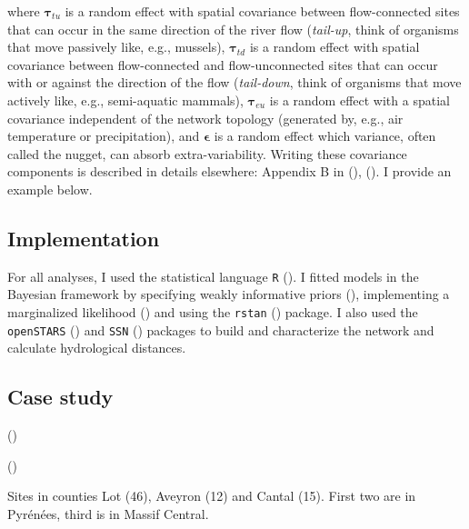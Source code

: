 \documentclass[
  11pt,
  a4paper,
]{article}
\begin{document}
where \(\boldsymbol{\tau}_{tu}\) is a random effect with spatial covariance between flow-connected sites that can occur in the same direction of the river flow (\emph{tail-up}, think of organisms that move passively like, e.g., mussels), \(\boldsymbol{\tau}_{td}\) is a random effect with spatial covariance between flow-connected and flow-unconnected sites that can occur with or against the direction of the flow (\emph{tail-down}, think of organisms that move actively like, e.g., semi-aquatic mammals), \(\boldsymbol{\tau}_{eu}\) is a random effect with a spatial covariance independent of the network topology (generated by, e.g., air temperature or precipitation), and \(\boldsymbol{\epsilon}\) is a random effect which variance, often called the nugget, can absorb extra-variability. Writing these covariance components is described in details elsewhere: Appendix B in (), (). I provide an example below.

\subsection{Implementation}\label{implementation}

For all analyses, I used the statistical language \texttt{R} (). I fitted models in the Bayesian framework by specifying weakly informative priors (), implementing a marginalized likelihood () and using the \texttt{rstan} () package. I also used the \texttt{openSTARS} () and \texttt{SSN} () packages to build and characterize the network and calculate hydrological distances.

\subsection{Case study}\label{case-study}

()

()

Sites in counties Lot (46), Aveyron (12) and Cantal (15). First two are in Pyrénées, third is in Massif Central.
\end{document}
